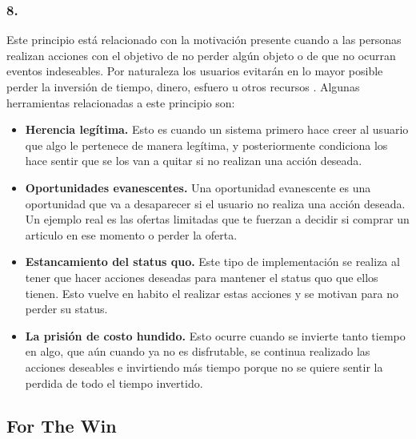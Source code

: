 \clearpage
\subsubsection{8. \principioVIII} \label{subsec:principioVIII}

 Este principio está relacionado con la motivación presente cuando a las personas realizan acciones
 con el objetivo de no perder algún objeto o de que no ocurran eventos indeseables. Por naturaleza
 los usuarios evitarán en lo mayor posible perder la inversión de tiempo, dinero, esfuero u otros
 recursos \cite[p. 311]{Octalysis}. Algunas herramientas relacionadas a este principio son:
        
    \begin{itemize}
    \item
    {\bf Herencia legítima.}
        Esto es cuando un sistema primero hace creer al usuario que algo le pertenece de manera
        legítima, y posteriormente condiciona los hace sentir que se los van a quitar si no realizan una acción deseada.
        \cite[p. 330]{Octalysis}
            
    \item
    {\bf Oportunidades evanescentes.}
        Una oportunidad evanescente es una oportunidad que va a desaparecer si el usuario no
        realiza una acción deseada. Un ejemplo real es las ofertas limitadas que te fuerzan
        a decidir si comprar un articulo en ese momento o perder la oferta.
        \cite[p. 333]{Octalysis}
            
    \item
    {\bf Estancamiento del status quo.}
        Este tipo de implementación se realiza al tener que hacer acciones deseadas para
        mantener el status quo que ellos tienen. Esto vuelve en habito el realizar estas
        acciones y se motivan para no perder su status.
        \cite[p. 334]{Octalysis}
            
    \item
    {\bf La prisión de costo hundido.}
        Esto ocurre cuando se invierte tanto tiempo en algo, que aún cuando ya no es disfrutable,
        se continua realizado las acciones deseables e invirtiendo más tiempo porque no se quiere
        sentir la perdida de todo el tiempo invertido.
        \cite[p. 338]{Octalysis}

    \end{itemize}
    
\clearpage


\subsection{For The Win} \label{sec:ForTheWin}

